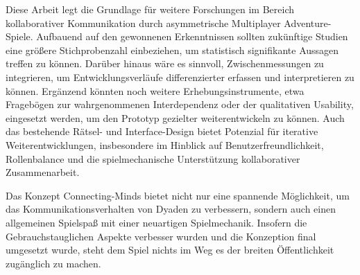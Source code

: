 Diese Arbeit legt die Grundlage für weitere Forschungen im Bereich kollaborativer Kommunikation durch asymmetrische Multiplayer Adventure-Spiele.
Aufbauend auf den gewonnenen Erkenntnissen sollten zukünftige Studien eine größere Stichprobenzahl einbeziehen, um statistisch signifikante Aussagen treffen zu können. Darüber hinaus wäre es sinnvoll, Zwischenmessungen zu integrieren, um Entwicklungsverläufe differenzierter erfassen und interpretieren zu können. Ergänzend könnten noch weitere Erhebungsinstrumente, etwa Fragebögen zur wahrgenommenen Interdependenz oder der qualitativen Usability, eingesetzt werden, um den Prototyp gezielter weiterentwickeln zu können. Auch das bestehende Rätsel- und Interface-Design bietet Potenzial für iterative Weiterentwicklungen, insbesondere im Hinblick auf Benutzerfreundlichkeit, Rollenbalance und die spielmechanische Unterstützung kollaborativer Zusammenarbeit.

Das Konzept Connecting-Minds bietet nicht nur eine spannende Möglichkeit, um das Kommunikationsverhalten von Dyaden zu verbessern, sondern auch einen allgemeinen Spielspaß mit einer neuartigen Spielmechanik. Insofern die Gebrauchstauglichen Aspekte verbesser wurden und die Konzeption final umgesetzt wurde, steht dem Spiel nichts im Weg es der breiten Öffentlichkeit zugänglich zu machen.